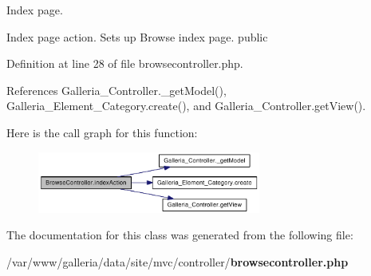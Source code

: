 Index page.

Index page action. Sets up Browse index page.  public 

Definition at line 28 of file browsecontroller.php.

References Galleria\_\-Controller.\_\-getModel(), Galleria\_\-Element\_\-Category.create(), and Galleria\_\-Controller.getView().

Here is the call graph for this function:\nopagebreak
\begin{figure}[H]
\begin{center}
\leavevmode
\includegraphics[width=208pt]{classBrowseController_c12a5cf382694a070e902cb5555d9726_cgraph}
\end{center}
\end{figure}


The documentation for this class was generated from the following file:\begin{CompactItemize}
\item 
/var/www/galleria/data/site/mvc/controller/{\bf browsecontroller.php}\end{CompactItemize}
